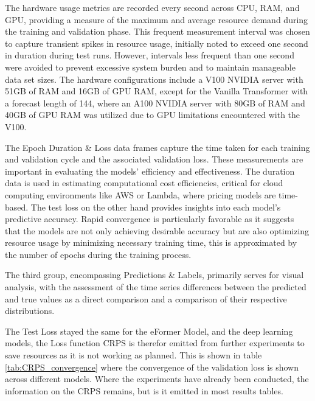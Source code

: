 \documentclass{article}
\begin{document}
The hardware usage metrics are recorded every second across CPU, RAM, and GPU, providing a measure of the maximum and average resource demand during the training and validation phase. This frequent measurement interval was chosen to capture transient spikes in resource usage, initially noted to exceed one second in duration during test runs. However, intervals less frequent than one second were avoided to prevent excessive system burden and to maintain manageable data set sizes. The hardware configurations include a V100 NVIDIA server with 51GB of RAM and 16GB of GPU RAM, except for the Vanilla Transformer with a forecast length of 144, where an A100 NVIDIA server with 80GB of RAM and 40GB of GPU RAM was utilized due to GPU limitations encountered with the V100.

The Epoch Duration \& Loss data frames capture the time taken for each training and validation cycle and the associated validation loss. These measurements are important in evaluating the models’ efficiency and effectiveness. The duration data is used in estimating computational cost efficiencies, critical for cloud computing environments like AWS or Lambda, where pricing models are time-based. The test loss on the other hand provides insights into each model's predictive accuracy. Rapid convergence is particularly favorable as it suggests that the models are not only achieving desirable accuracy but are also optimizing resource usage by minimizing necessary training time, this is approximated by the number of epochs during the training process.

The third group, encompassing Predictions \& Labels, primarily serves for visual analysis, with the assessment of the time series differences between the predicted and true values as a direct comparison and a comparison of their respective distributions.

The Test Loss stayed the same for the eFormer Model, and the deep learning models, the Loss function CRPS is therefor emitted from further experiments to save resources as it is not working as planned. This is shown in table \ref{tab:CRPS_convergence} where the convergence of the validation loss is shown across different models. Where the experiments have already been conducted, the information on the CRPS remains, but is it emitted in most results tables.
\end{document}
